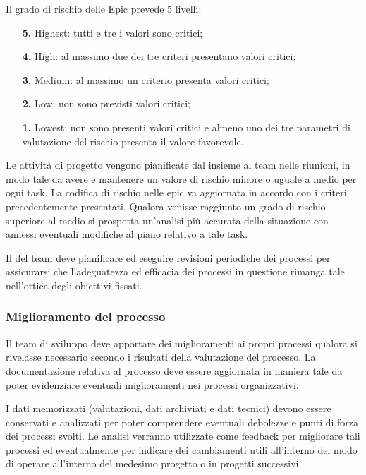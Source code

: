 Il grado di rischio delle Epic prevede 5 livelli:
\begin{enumerate}
    \item[\textbf{5.}] Highest: tutti e tre i valori sono critici;
    \item[\textbf{4.}] High: al massimo due dei tre criteri presentano valori critici;
    \item[\textbf{3.}] Medium: al massimo un criterio presenta valori critici;
    \item[\textbf{2.}] Low: non sono previsti valori critici;
    \item[\textbf{1.}] Lowest: non sono presenti valori critici e almeno uno dei tre parametri di valutazione del rischio presenta il valore favorevole.
\end{enumerate}

Le attività di progetto vengono pianificate dal \responsabile{} insieme al team nelle riunioni, in modo tale da avere e mantenere un valore di rischio minore o uguale a medio per ogni task. La codifica di rischio nelle epic va aggiornata in accordo con i criteri precedentemente presentati. Qualora venisse raggiunto un grado di rischio superiore al medio si prospetta un'analisi più accurata della situazione con annessi eventuali modifiche al piano relativo a tale task.

Il \responsabile{} del team deve pianificare ed eseguire revisioni periodiche dei processi per assicurarsi che l'adeguatezza ed efficacia dei processi in questione rimanga tale nell'ottica degli obiettivi fissati.

\subsubsection{Miglioramento del processo}

Il team di sviluppo deve apportare dei miglioramenti ai propri processi qualora si rivelasse necessario secondo i risultati della valutazione del processo. La documentazione relativa al processo deve essere aggiornata in maniera tale da poter evidenziare eventuali miglioramenti nei processi organizzativi.

I dati memorizzati (valutazioni, dati archiviati e dati tecnici) devono essere conservati e analizzati per poter comprendere eventuali debolezze e punti di forza dei processi svolti. Le analisi verranno utilizzate come feedback per migliorare tali processi ed eventualmente per indicare dei cambiamenti utili all'interno del modo di operare all'interno del medesimo progetto o in progetti successivi.
